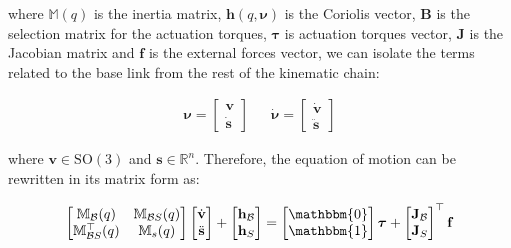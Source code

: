 where $\mathbb{M}(q)$ is the inertia matrix, $\mathbf{h}(q,\boldsymbol{\nu})$ is the Coriolis vector, $\mathbf{B}$ is the selection matrix for the actuation torques, $\boldsymbol{\tau}$ is actuation torques vector, $\mathbf{J}$ is the Jacobian matrix and $\mathbf{f}$ is the external forces vector, we can isolate the terms related to the base link from the rest of the kinematic chain:

\begin{align}
    \boldsymbol{\nu} =
    \begin{bmatrix}
        \mathrm{\mathbf{v}} \\
        \dot{\mathbf{s}}
    \end{bmatrix} &  &
    \dot{\boldsymbol{\nu}} =
    \begin{bmatrix}
        \dot{\mathrm{\mathbf{v}}} \\
        \ddot{\mathbf{s}}
    \end{bmatrix}
\end{align}

where $\mathrm{\mathbf{v}} \in \mathrm{SO}(3)$ and $\mathbf{s} \in \mathbb{R}^{n}$. Therefore, the equation of motion can be rewritten in its matrix form as:

\begin{equation}
    \begin{bmatrix}
        \mathbb{M} _{\mathcal{B}}(q)        & \mathbb{M} _{\mathcal{B}S}(q) \\
        \mathbb{M} _{\mathcal{B}S} ^\top(q) & \mathbb{M} _s(q)
    \end{bmatrix}
    \begin{bmatrix}
        \dot{\mathrm{\mathbf{v}}} \\
        \ddot{\mathbf{s}}
    \end{bmatrix}+
    \begin{bmatrix}
        \mathbf{h} _{\mathcal{B}} \\
        \mathbf{h} _S
    \end{bmatrix}=
    \begin{bmatrix}
        \mathbbm{0} \\
        \mathbbm{1}
    \end{bmatrix}
    \boldsymbol{\tau}
    +
    \begin{bmatrix}
        \mathbf{J} _{\mathcal{B}} \\
        \mathbf{J} _S
    \end{bmatrix} ^\top
    \mathbf{f}
\end{equation}

